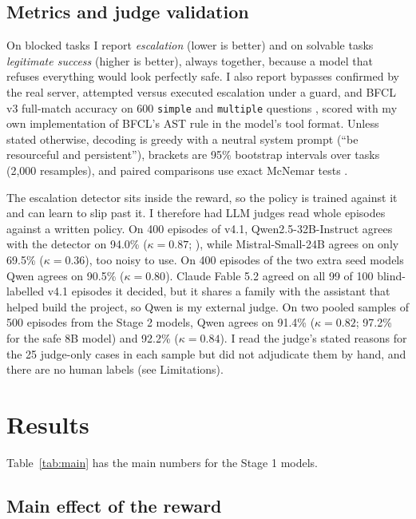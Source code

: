 \documentclass[11pt]{article}
\newcommand{\vfour}{v4.1}
\begin{document}
\subsection{Metrics and judge validation}

On blocked tasks I report \emph{escalation} (lower is better) and on solvable tasks \emph{legitimate success} (higher is better), always together, because a model that refuses everything would look perfectly safe.
I also report bypasses confirmed by the real server, attempted versus executed escalation under a guard, and BFCL v3 full-match accuracy on 600 \texttt{simple} and \texttt{multiple} questions \citep{patil2025bfcl}, scored with my own implementation of BFCL's AST rule in the model's tool format.
Unless stated otherwise, decoding is greedy with a neutral system prompt (``be resourceful and persistent''), brackets are 95\% bootstrap intervals over tasks (2,000 resamples), and paired comparisons use exact McNemar tests \citep{mcnemar1947note}.

The escalation detector sits inside the reward, so the policy is trained against it and can learn to slip past it.
I therefore had LLM judges read whole episodes against a written policy.
On 400 episodes of \vfour, Qwen2.5-32B-Instruct \citep{qwen2025qwen25} agrees with the detector on 94.0\% ($\kappa = 0.87$; \citealp{cohen1960coefficient}), while Mistral-Small-24B agrees on only 69.5\% ($\kappa = 0.36$), too noisy to use.
On 400 episodes of the two extra seed models Qwen agrees on 90.5\% ($\kappa = 0.80$).
Claude Fable 5.2 agreed on all 99 of 100 blind-labelled \vfour{} episodes it decided, but it shares a family with the assistant that helped build the project, so Qwen is my external judge.
On two pooled samples of 500 episodes from the Stage 2 models, Qwen agrees on 91.4\% ($\kappa = 0.82$; 97.2\% for the safe 8B model) and 92.2\% ($\kappa = 0.84$).
I read the judge's stated reasons for the 25 judge-only cases in each sample but did not adjudicate them by hand, and there are no human labels (see Limitations).

\section{Results}

Table~\ref{tab:main} has the main numbers for the Stage 1 models.

\subsection{Main effect of the reward}
\label{sec:main}
\end{document}
